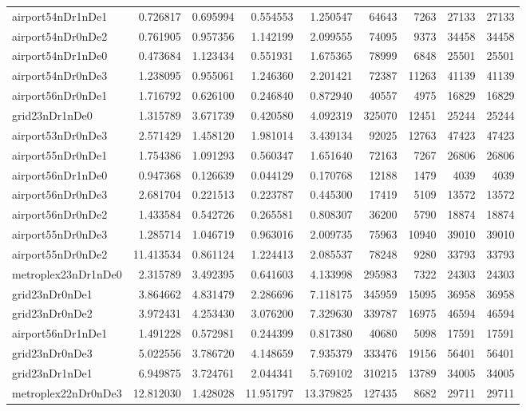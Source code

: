 \begin{longtable}{|l|r|r|r|r|r|r|r|r|}
airport54nDr1nDe1 & 0.726817 & 0.695994 & 0.554553 & 1.250547 & 64643 & 7263 & 27133 & 27133 \\
airport54nDr0nDe2 & 0.761905 & 0.957356 & 1.142199 & 2.099555 & 74095 & 9373 & 34458 & 34458 \\
airport54nDr1nDe0 & 0.473684 & 1.123434 & 0.551931 & 1.675365 & 78999 & 6848 & 25501 & 25501 \\
airport54nDr0nDe3 & 1.238095 & 0.955061 & 1.246360 & 2.201421 & 72387 & 11263 & 41139 & 41139 \\
airport56nDr0nDe1 & 1.716792 & 0.626100 & 0.246840 & 0.872940 & 40557 & 4975 & 16829 & 16829 \\
grid23nDr1nDe0 & 1.315789 & 3.671739 & 0.420580 & 4.092319 & 325070 & 12451 & 25244 & 25244 \\
airport53nDr0nDe3 & 2.571429 & 1.458120 & 1.981014 & 3.439134 & 92025 & 12763 & 47423 & 47423 \\
airport55nDr0nDe1 & 1.754386 & 1.091293 & 0.560347 & 1.651640 & 72163 & 7267 & 26806 & 26806 \\
airport56nDr1nDe0 & 0.947368 & 0.126639 & 0.044129 & 0.170768 & 12188 & 1479 & 4039 & 4039 \\
airport56nDr0nDe3 & 2.681704 & 0.221513 & 0.223787 & 0.445300 & 17419 & 5109 & 13572 & 13572 \\
airport56nDr0nDe2 & 1.433584 & 0.542726 & 0.265581 & 0.808307 & 36200 & 5790 & 18874 & 18874 \\
airport55nDr0nDe3 & 1.285714 & 1.046719 & 0.963016 & 2.009735 & 75963 & 10940 & 39010 & 39010 \\
airport55nDr0nDe2 & 11.413534 & 0.861124 & 1.224413 & 2.085537 & 78248 & 9280 & 33793 & 33793 \\
metroplex23nDr1nDe0 & 2.315789 & 3.492395 & 0.641603 & 4.133998 & 295983 & 7322 & 24303 & 24303 \\
grid23nDr0nDe1 & 3.864662 & 4.831479 & 2.286696 & 7.118175 & 345959 & 15095 & 36958 & 36958 \\
grid23nDr0nDe2 & 3.972431 & 4.253430 & 3.076200 & 7.329630 & 339787 & 16975 & 46594 & 46594 \\
airport56nDr1nDe1 & 1.491228 & 0.572981 & 0.244399 & 0.817380 & 40680 & 5098 & 17591 & 17591 \\
grid23nDr0nDe3 & 5.022556 & 3.786720 & 4.148659 & 7.935379 & 333476 & 19156 & 56401 & 56401 \\
grid23nDr1nDe1 & 6.949875 & 3.724761 & 2.044341 & 5.769102 & 310215 & 13789 & 34005 & 34005 \\
metroplex22nDr0nDe3 & 12.812030 & 1.428028 & 11.951797 & 13.379825 & 127435 & 8682 & 29711 & 29711 \\

\end{longtable}
